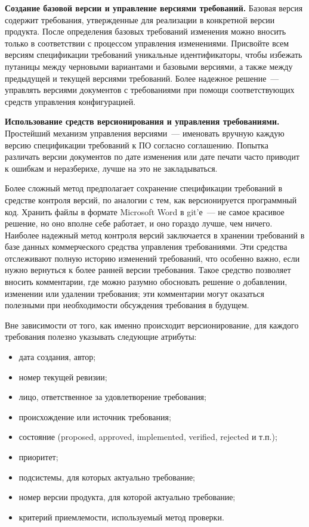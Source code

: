 \documentclass{../../text-style}
\begin{document}
\textbf{Создание базовой версии и управление версиями требований.} Базовая версия содержит требования, утвержденные для реализации в конкретной версии продукта. После определения базовых требований изменения можно вносить только в соответствии с процессом управления изменениями. Присвойте всем версиям спецификации требований уникальные идентификаторы, чтобы избежать путаницы между черновыми вариантами и базовыми версиями, а также между предыдущей и текущей версиями требований. Более надежное решение~--- управлять версиями документов с требованиями при помощи соответствующих средств управления конфигурацией.

\textbf{Использование средств версионирования и управления требованиями.} Простейший механизм управления версиями~--- именовать вручную каждую версию спецификации требований к ПО согласно соглашению. Попытка различать версии документов по дате изменения или дате печати часто приводит к ошибкам и неразберихе, лучше на это не закладываться.

Более сложный метод предполагает сохранение спецификации требований в средстве контроля версий, по аналогии с тем, как версионируется программный код. Хранить файлы в формате Microsoft Word в git’е~--- не самое красивое решение, но оно вполне себе работает, и оно гораздо лучше, чем ничего. Наиболее надежный метод контроля версий заключается в хранении требований в базе данных коммерческого средства управления требованиями. Эти средства отслеживают полную историю изменений требований, что особенно важно, если нужно вернуться к более ранней версии требования. Такое средство позволяет вносить комментарии, где можно разумно обосновать решение о добавлении, изменении или удалении требования; эти комментарии могут оказаться полезными при необходимости обсуждения требования в будущем.

Вне зависимости от того, как именно происходит версионирование, для каждого требования полезно указывать следующие атрибуты:
\begin{itemize}
    \item дата создания, автор;
    \item номер текущей ревизии;
    \item лицо, ответственное за удовлетворение требования;
    \item происхождение или источник требования;
    \item состояние (proposed, approved, implemented, verified, rejected и т.п.);
    \item приоритет;
    \item подсистемы, для которых актуально требование;
    \item номер версии продукта, для которой актуально требование;
    \item критерий приемлемости, используемый метод проверки.
\end{itemize}
\end{document}
